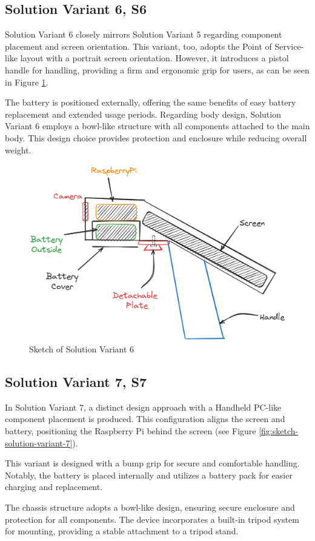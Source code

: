 \subsection{Solution Variant 6, S6}
Solution Variant 6 closely mirrors Solution Variant 5 regarding component placement and screen orientation. This variant, too, adopts the Point of Service-like layout with a portrait screen orientation. However, it introduces a pistol handle for handling, providing a firm and ergonomic grip for users, as can be seen in Figure \ref{fig:sketch-solution-variant-6}.

The battery is positioned externally, offering the same benefits of easy battery replacement and extended usage periods. Regarding body design, Solution Variant 6 employs a bowl-like structure with all components attached to the main body. This design choice provides protection and enclosure while reducing overall weight.

\begin{figure}[H]
    \centering
    \includegraphics[width=0.5\linewidth]{texs/Part1/chapter3/image/v6.png}
    \caption{Sketch of Solution Variant 6}
    \label{fig:sketch-solution-variant-6}
\end{figure}

\subsection{Solution Variant 7, S7}
In Solution Variant 7, a distinct design approach with a Handheld PC-like component placement is produced. This configuration aligns the screen and battery, positioning the Raspberry Pi behind the screen (see Figure \ref{fig:sketch-solution-variant-7}).

This variant is designed with a bump grip for secure and comfortable handling. Notably, the battery is placed internally and utilizes a battery pack for easier charging and replacement.

The chassis structure adopts a bowl-like design, ensuring secure enclosure and protection for all components. The device incorporates a built-in tripod system for mounting, providing a stable attachment to a tripod stand.

